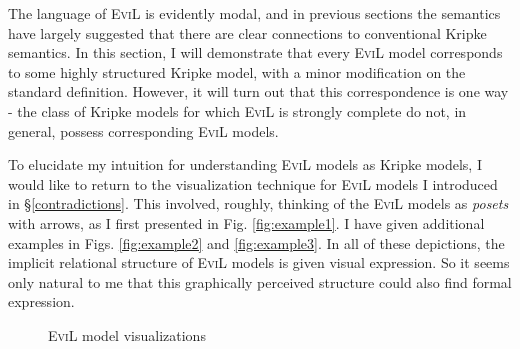 The language of \textsc{EviL} is evidently modal, and in previous
sections the semantics have largely suggested that there are clear
connections to conventional Kripke semantics.  
In this section, I will demonstrate that every \textsc{EviL} model
corresponds to some highly structured Kripke model, with a minor
modification on the standard definition.  However, it will turn out
that this correspondence is one way - the class of Kripke models for
which \textsc{EviL} is strongly complete do not, in general,
possess corresponding \textsc{EviL} models.

To elucidate my intuition for understanding \textsc{EviL} models as
Kripke models, I would like to return to the visualization technique for
\textsc{EviL} models I introduced in \S\ref{contradictions}.  This involved, roughly,
thinking of the \textsc{EviL} models as \emph{posets} with arrows,
as I first presented in Fig. \ref{fig:example1}.  I have given
additional examples in Figs. \ref{fig:example2} and
\ref{fig:example3}.  
In all of these depictions, the implicit relational structure of \textsc{EviL} models is given
visual expression.  So it seems only natural to me that this graphically perceived structure
could also find formal expression.
\begin{figure}[ht]
\centering
{}
\caption{\textsc{EviL} model visualizations}
\end{figure}

